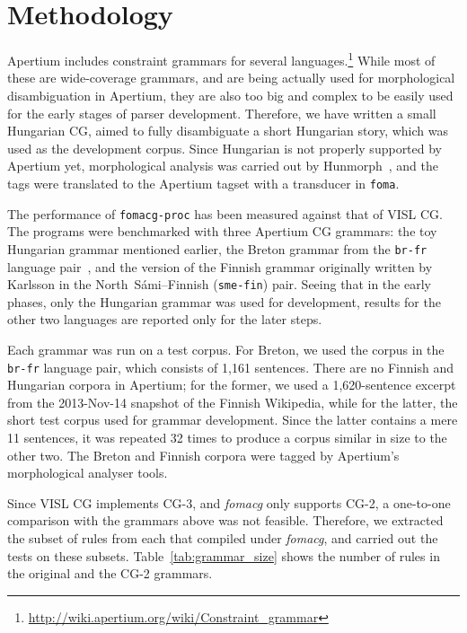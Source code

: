 \documentclass[11pt]{article}
\begin{document}

\section{Methodology}
\label{sec:methodology}

Apertium includes constraint grammars for several
languages.\footnote{\url{http://wiki.apertium.org/wiki/Constraint_grammar}} While
most of these are wide-coverage grammars, and are being actually used for morphological
disambiguation in Apertium, they are also too big and complex to be easily used
for the early stages of parser development. Therefore, we have written a small
Hungarian CG, aimed to fully disambiguate a short Hungarian story, which was used
as the development corpus. Since Hungarian is not properly supported by Apertium
yet, morphological analysis was carried out by Hunmorph~\cite{Tron:2005}, and
the tags were translated to the Apertium tagset with a transducer in \texttt{foma}.

The performance of \texttt{fomacg-proc} has been measured against that of
VISL CG. The programs were benchmarked with three Apertium CG grammars: the toy
Hungarian grammar mentioned earlier, the Breton grammar from the \texttt{br-fr}
language pair~\cite{Tyers:2010}, and the version of the Finnish grammar originally written
by Karlsson in the North~Sámi--Finnish (\texttt{sme-fin}) pair. %
Seeing that in the early phases, only the Hungarian grammar was used for
development, results for the other two languages are reported only for the later
steps.

Each grammar was run on a test corpus. For Breton, we used the corpus
in the \texttt{br-fr} language pair, which consists of 1,161 sentences. There
are no Finnish and Hungarian corpora in Apertium; for the former, we used a
1,620-sentence excerpt from the 2013-Nov-14 snapshot of the Finnish Wikipedia,
while for the latter, the short test corpus used for grammar development. Since
the latter contains a mere 11 sentences, it was repeated 32 times to produce
a corpus similar in size to the other two. The Breton and Finnish corpora
were tagged by Apertium's morphological analyser tools.

Since VISL CG implements CG-3, and \emph{fomacg} only supports CG-2, a one-to-one
comparison with the grammars above was not feasible. Therefore, we extracted the
subset of rules from each that compiled under \emph{fomacg}, and carried out the tests
on these subsets. Table~\ref{tab:grammar_size} shows the number of rules in the
original and the CG-2 grammars.
\end{document}
